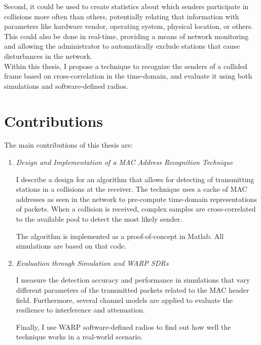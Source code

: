Second, it could be used to create statistics about which senders participate in collisions more often than others, potentially relating that information with parameters like hardware vendor, operating system, physical location, or others. This could also be done in real-time, providing a means of network monitoring and allowing the administrator to automatically exclude stations that cause disturbances in the network.\\

Within this thesis, I propose a technique to recognize the senders of a collided frame based on cross-correlation in the time-domain, and evaluate it using both simulations and software-defined radios.

\clearpage



\section{Contributions}

The main contributions of this thesis are:

\begin{enumerate}
	\item \textit{Design and Implementation of a MAC Address Recognition Technique}

				I describe a design for an algorithm that allows for detecting of transmitting stations in a collisions at the receiver. The technique uses a cache of MAC addresses as seen in the network to pre-compute time-domain representations of packets. When a collision is received, complex samples are cross-correlated to the available pool to detect the most likely sender.

				The algorithm is implemented as a proof-of-concept in Matlab. All simulations are based on that code.

	\item \textit{Evaluation through Simulation and WARP SDRs}

				I measure the detection accuracy and performance in simulations that vary different parameters of the transmitted packets related to the MAC header field. Furthermore, several channel models are applied to evaluate the resilience to interference and attenuation.

				Finally, I use WARP software-defined radios to find out how well the technique works in a real-world scenario.

\end{enumerate}


